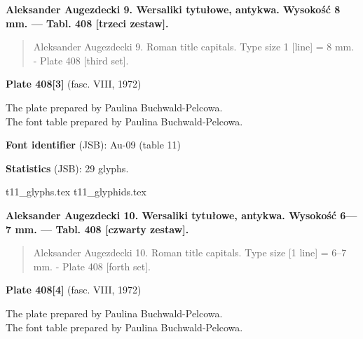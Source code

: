 \documentclass[12pt]{article}
\newcommand{\bg}{\begingl}
\newcommand{\pismoPL}[1]{{\relsize{2}\Junicode\textbf{#1}}}
\newcommand{\pismoEN}[1]{{\relsize{1}\Junicode\begin{quote}#1\end{quote}}}
\newcommand{\plate}[3]{\textbf{Plate #1} (fasc. #2, #3)}
\newcommand{\fontID}[2]{{\relsize{1}\Junicode\textbf{Font identifier} (JSB): #1 (table #2)}}
\newcommand{\fontstat}[1]{{\relsize{1}\Junicode\textbf{Statistics} (JSB): #1 glyphs.}}
\begin{document}

\pismoPL{Aleksander Augezdecki 9. Wersaliki tytułowe, antykwa. Wysokość 8 mm. — Tabl. 408 [trzeci zestaw].}

\pismoEN{Aleksander Augezdecki 9. Roman title capitals.  Type size 1 [line] = 8 mm. - Plate 408 [third set].}
\medskip

\plate{408[3]}{VIII}{1972}

The plate    prepared by Paulina Buchwald-Pelcowa.\\
The font table    prepared by Paulina Buchwald-Pelcowa.\\


\bigskip

\fontID{Au-09}{11}

\fontstat{29}

  {t11_glyphs.tex}
  {t11_glyphids.tex}


\newpage



\pismoPL{Aleksander Augezdecki 10. Wersaliki tytułowe, antykwa. Wysokość 6—7 mm. — Tabl. 408 [czwarty zestaw].}

\pismoEN{Aleksander Augezdecki 10. Roman title capitals.  Type size [1 line] = 6--7 mm. - Plate 408 [forth set].}
\medskip

\plate{408[4]}{VIII}{1972}

The plate    prepared by Paulina Buchwald-Pelcowa.\\
The font table    prepared by Paulina Buchwald-Pelcowa.\\


\bigskip
\end{document}
